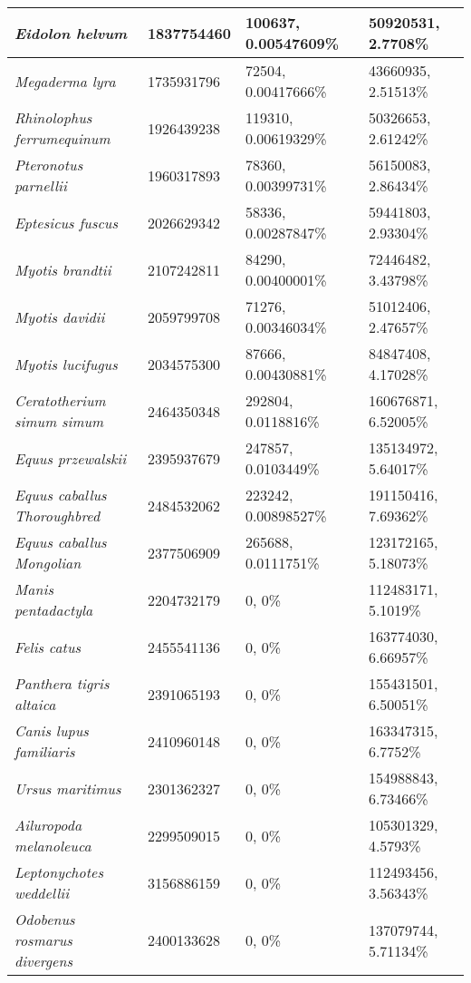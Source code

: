 {\begin{longtable}{| L{4cm} | L{2.7cm}  | L{3.7cm} | L{3.7cm} |}
\textit{Eidolon helvum} & 1837754460 & 100637, 0.00547609\% & 50920531, 2.7708\% \\ \hline
\textit{Megaderma lyra} & 1735931796 & 72504, 0.00417666\% & 43660935, 2.51513\% \\ \hline
\textit{Rhinolophus ferrumequinum} & 1926439238 & 119310, 0.00619329\% & 50326653, 2.61242\% \\ \hline
\textit{Pteronotus parnellii} & 1960317893 & 78360, 0.00399731\% & 56150083, 2.86434\% \\ \hline
\textit{Eptesicus fuscus} & 2026629342 & 58336, 0.00287847\% & 59441803, 2.93304\% \\ \hline
\textit{Myotis brandtii} & 2107242811 & 84290, 0.00400001\% & 72446482, 3.43798\% \\ \hline
\textit{Myotis davidii} & 2059799708 & 71276, 0.00346034\% & 51012406, 2.47657\% \\ \hline
\textit{Myotis lucifugus} & 2034575300 & 87666, 0.00430881\% & 84847408, 4.17028\% \\ \hline
\textit{Ceratotherium simum simum} & 2464350348 & 292804, 0.0118816\% & 160676871, 6.52005\% \\ \hline
\textit{Equus przewalskii} & 2395937679 & 247857, 0.0103449\% & 135134972, 5.64017\% \\ \hline
\textit{Equus caballus Thoroughbred} & 2484532062 & 223242, 0.00898527\% & 191150416, 7.69362\% \\ \hline
\textit{Equus caballus Mongolian} & 2377506909 & 265688, 0.0111751\% & 123172165, 5.18073\% \\ \hline
\textit{Manis pentadactyla} & 2204732179 & 0, 0\% & 112483171, 5.1019\% \\ \hline
\textit{Felis catus} & 2455541136 & 0, 0\% & 163774030, 6.66957\% \\ \hline
\textit{Panthera tigris altaica} & 2391065193 & 0, 0\% & 155431501, 6.50051\% \\ \hline
\textit{Canis lupus familiaris} & 2410960148 & 0, 0\% & 163347315, 6.7752\% \\ \hline
\textit{Ursus maritimus} & 2301362327 & 0, 0\% & 154988843, 6.73466\% \\ \hline
\textit{Ailuropoda melanoleuca} & 2299509015 & 0, 0\% & 105301329, 4.5793\% \\ \hline
\textit{Leptonychotes weddellii} & 3156886159 & 0, 0\% & 112493456, 3.56343\% \\ \hline
\textit{Odobenus rosmarus divergens} & 2400133628 & 0, 0\% & 137079744, 5.71134\% \\ \hline

\end{longtable}}
